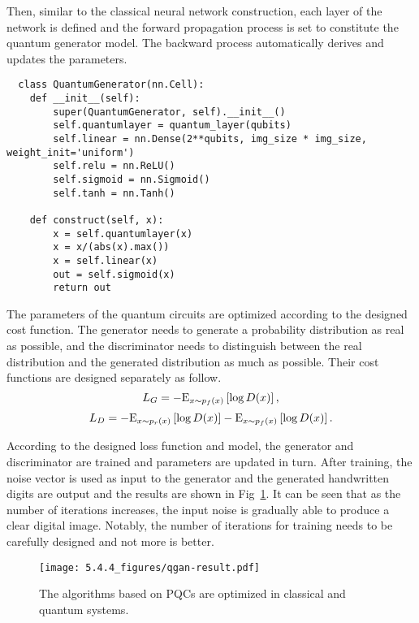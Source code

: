 Then, similar to the classical neural network construction, each layer of the network is defined and the forward propagation process is set to constitute the quantum generator model. The backward process automatically derives and updates the parameters.
\begin{lstlisting}
  class QuantumGenerator(nn.Cell):
    def __init__(self):
        super(QuantumGenerator, self).__init__()
        self.quantumlayer = quantum_layer(qubits)
        self.linear = nn.Dense(2**qubits, img_size * img_size, weight_init='uniform')
        self.relu = nn.ReLU()
        self.sigmoid = nn.Sigmoid()
        self.tanh = nn.Tanh()

    def construct(self, x):
        x = self.quantumlayer(x)
        x = x/(abs(x).max())
        x = self.linear(x)
        out = self.sigmoid(x)
        return out
\end{lstlisting}

The parameters of the quantum circuits are optimized according to the designed cost function. The generator needs to generate a probability distribution as real as possible, and the discriminator needs to distinguish between the real distribution and the generated distribution as much as possible. Their cost functions are designed separately as follow.
\begin{equation}
  {L_G} =  - {{\rm E}_{x\sim{p_f}(x)}}\left[ {\log D(x)} \right],
\end{equation}
\begin{equation}
  {L_D} =  - {{\rm E}_{x\sim{p_r}(x)}}\left[ {\log D(x)} \right] - {{\rm E}_{x\sim{p_f}(x)}}\left[ {\log D(x)} \right].
\end{equation}

According to the designed loss function and model, the generator and discriminator are trained and parameters are updated in turn. After training, the noise vector is used as input to the generator and the generated handwritten digits are output and the results are shown in Fig~\ref{qgan-result}. It can be seen that as the number of iterations increases, the input noise is gradually able to produce a clear digital image. Notably, the number of iterations for training needs to be carefully designed and not more is better.
\begin{figure}[htbp]
  \centering
  \texttt{[image: 5.4.4\_figures/qgan-result.pdf]}
  \caption{\label{qgan-result} The algorithms based on PQCs are optimized in classical and quantum systems.}
\end{figure}